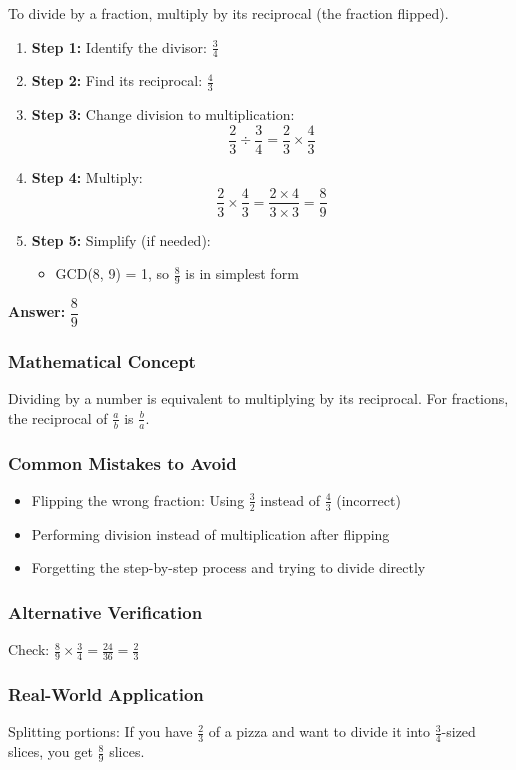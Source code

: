 \documentclass[12pt]{article}
\begin{document}
To divide by a fraction, multiply by its reciprocal (the fraction flipped).

\begin{enumerate}
\item \textbf{Step 1:} Identify the divisor: $\frac{3}{4}$
\item \textbf{Step 2:} Find its reciprocal: $\frac{4}{3}$
\item \textbf{Step 3:} Change division to multiplication:
  \[
  \frac{2}{3} \div \frac{3}{4} = \frac{2}{3} \times \frac{4}{3}
  \]
\item \textbf{Step 4:} Multiply:
  \[
  \frac{2}{3} \times \frac{4}{3} = \frac{2 \times 4}{3 \times 3} = \frac{8}{9}
  \]
\item \textbf{Step 5:} Simplify (if needed):
  \begin{itemize}
  \item GCD(8, 9) = 1, so $\frac{8}{9}$ is in simplest form
  \end{itemize}
\end{enumerate}

\textbf{Answer: } $\dfrac{8}{9}$

\subsubsection*{Mathematical Concept}
Dividing by a number is equivalent to multiplying by its reciprocal. For fractions, the reciprocal of $\frac{a}{b}$ is $\frac{b}{a}$.

\subsubsection*{Common Mistakes to Avoid}
\begin{itemize}
\item Flipping the wrong fraction: Using $\frac{3}{2}$ instead of $\frac{4}{3}$ (incorrect)
\item Performing division instead of multiplication after flipping
\item Forgetting the step-by-step process and trying to divide directly
\end{itemize}

\subsubsection*{Alternative Verification}
Check: $\frac{8}{9} \times \frac{3}{4} = \frac{24}{36} = \frac{2}{3}$ 

\subsubsection*{Real-World Application}
Splitting portions: If you have $\frac{2}{3}$ of a pizza and want to divide it into $\frac{3}{4}$-sized slices, you get $\frac{8}{9}$ slices.
\end{document}
